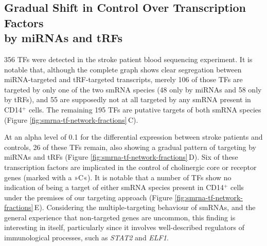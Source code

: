 \subsection{Gradual Shift in Control Over Transcription Factors\\ by miRNAs and tRFs}
356 TFs were detected in the stroke patient blood sequencing experiment. It is notable that, although the complete graph shows clear segregation between miRNA-targeted and tRF-targeted transcripts, merely 106 of those TFs are targeted by only one of the two smRNA species (48 only by miRNAs and 58 only by tRFs), and 55 are supposedly not at all targeted by any smRNA present in CD14$^+$ cells. The remaining 195 TFs are putative targets of both smRNA species (Figure \ref{fig:smrna-tf-network-fractions}\,C). 

At an alpha level of 0.1 for the differential expression between stroke patients and controls, 26 of these TFs remain, also showing a gradual pattern of targeting by miRNAs and tRFs (Figure \ref{fig:smrna-tf-network-fractions}\,D). Six of these transcription factors are implicated in the control of cholinergic core or receptor genes (marked with a »C«). It is notable that a number of TFs show no indication of being a target of either smRNA species present in CD14$^+$ cells under the premises of our targeting approach (Figure \ref{fig:smrna-tf-network-fractions}\,E). Considering the multiple-targeting behaviour of smRNAs, and the general experience that non-targeted genes are uncommon, this finding is interesting in itself, particularly since it involves well-described regulators of immunological processes, such as \emph{STAT2} and \emph{ELF1}.


